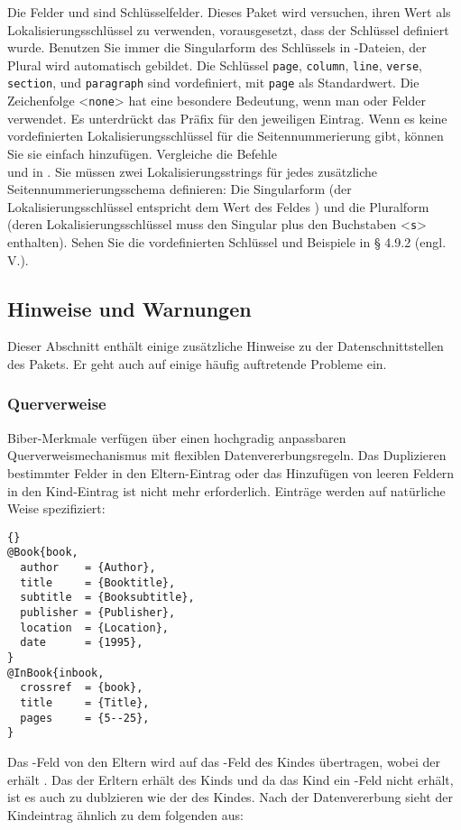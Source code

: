 \documentclass{ltxdockit}[2011/03/25]
\newcommand*{\biber}{Biber\xspace}
\begin{document}
Die Felder  und  sind Schlüsselfelder. Dieses
Paket wird versuchen, ihren Wert als Lokalisierungsschlüssel zu verwenden,
vorausgesetzt, dass der Schlüssel definiert wurde. Benutzen Sie immer die
Singularform des Schlüssels in -Dateien, der Plural wird automatisch
gebildet. Die Schlüssel \texttt{page}, \texttt{column}, \texttt{line},
\texttt{verse}, \texttt{section}, und \texttt{paragraph} sind vordefiniert, mit
\texttt{page} als Standardwert. Die Zeichenfolge <\texttt{none}> hat eine
besondere Bedeutung, wenn man  oder
 Felder verwendet. Es unterdrückt das Präfix für den
jeweiligen Eintrag. Wenn es keine vordefinierten Lokalisierungsschlüssel für die
Seitennummerierung gibt, können Sie sie einfach hinzufügen. Vergleiche die
Befehle\\  und  in
. Sie müssen zwei Lokalisierungsstrings für jedes zusätzliche
Seitennummerierungsschema definieren: Die Singularform (der
Lokalisierungsschlüssel entspricht dem Wert des Feldes )
und die Pluralform (deren Lokalisierungsschlüssel muss den Singular plus den
Buchstaben <\texttt{s}> enthalten). Sehen Sie die vordefinierten Schlüssel und
Beispiele in § 4.9.2 (engl. V.). %

\subsection{Hinweise und Warnungen} \label{bib:cav}

Dieser Abschnitt enthält einige zusätzliche Hinweise zu der
Datenschnittstellen des Pakets. Er geht auch auf einige häufig auftretende
Probleme ein.

\subsubsection{Querverweise} \label{bib:cav:ref}

\biber-Merkmale verfügen über einen hochgradig anpassbaren Querverweismechanismus mit flexiblen Datenvererbungsregeln. Das Duplizieren bestimmter Felder in den Eltern-Eintrag oder das Hinzufügen von leeren Feldern in den Kind-Eintrag ist nicht mehr erforderlich. Einträge werden auf natürliche Weise spezifiziert:

\begin{lstlisting}[style=bibtex]{}
@Book{book,
  author	= {Author},
  title		= {Booktitle},
  subtitle	= {Booksubtitle},
  publisher	= {Publisher},
  location	= {Location},
  date		= {1995},
}
@InBook{inbook,
  crossref	= {book},
  title		= {Title},
  pages		= {5--25},
}
\end{lstlisting}
%
Das -Feld von den Eltern wird
auf das -Feld des Kindes übertragen,
wobei der  erhält . Das  
der Erltern erhält  des Kinds und da das Kind ein
 -Feld nicht erhält, ist es auch zu dublzieren wie der 
 des Kindes. Nach der Datenvererbung sieht der Kindeintrag ähnlich zu dem folgenden aus:
\end{document}

